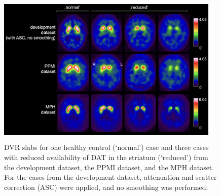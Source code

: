 \begin{figure}[t]
    \centering
    \colorbox{black}{%
     \includegraphics[width=0.95\textwidth]{content/figures/datasets_samples.png}%
     }
    \caption{DVR slabs for one healthy control (`normal') case 
    and three cases with reduced availability of DAT in the striatum (`reduced')
    from the development dataset, the PPMI dataset, and the MPH dataset.
    For the cases from the development dataset, attenuation and scatter correction (ASC) were applied, 
    and no smoothing was performed.} 
    \label{fig:datasets_samples}
\end{figure}
